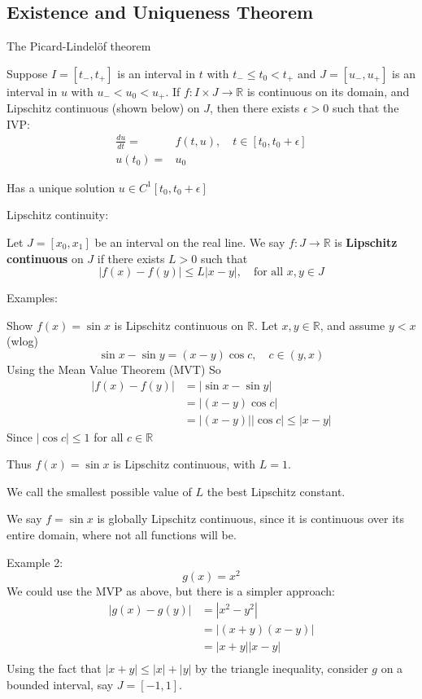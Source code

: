 \documentclass{X:/Documents/Coding/Latex/myassignment}
\begin{document}
\subsection{Existence and Uniqueness Theorem}
The Picard-Lindel\"of theorem 

Suppose $I = [t_-,t_+]$ is an interval in $t$ with $t_- \leq t_0 < t_+$ and $J=[u_-,u_+]$ is an interval in $u$ with $u_-<u_0<u_+$. If $f : I\times J \to \mathbb{R}$ is continuous on its domain, and Lipschitz continuous (shown below) on $J$, then there exists $\epsilon >0$ such that the IVP:
\begin{align*}
    \frac{du}{dt} =& f(t,u),\quad t\in [t_0,t_0+\epsilon]\\
    u(t_0) =& u_0
\end{align*}

Has a unique solution $u \in C^1 [t_0,t_0+\epsilon]$

Lipschitz continuity:

Let $J=[x_0,x_1]$ be an interval on the real line. We say $f: J\to \mathbb{R}$ is  \textbf{Lipschitz continuous} on $J$ if there exists $L>0$ such that
\[|f(x) - f(y)| \leq L|x-y|,\quad \text{for all } x,y\in J\]

Examples:

Show $f(x) = \sin x$ is Lipschitz continuous on $\mathbb{R}$. Let $x,y \in \mathbb{R}$, and assume $y < x$ (wlog)
\[\sin x - \sin y = (x - y)\cos c,\quad c \in (y,x)\]
Using the Mean Value Theorem (MVT)
So
\begin{align*}
    |f(x) - f(y)| &= |\sin x - \sin y|\\
    &=|(x - y)\cos c|\\
    &=|(x-y)||\cos c| \leq |x-y|
\end{align*}
Since $|\cos c| \leq 1 $ for all $c \in \mathbb{R}$

Thus $f(x) = \sin x$ is Lipschitz continuous, with $L=1$. 

We call the smallest possible value of $L$ the best Lipschitz constant.

We say $f=\sin x$ is globally Lipschitz continuous, since it is continuous over its entire domain, where not all functions will be.


Example 2:
\[g(x) = x^2\]
We could use the MVP as above, but there is a simpler approach:
\begin{align*}
    |g(x) - g(y)| &= |x^2 - y^2|\\
    &= |(x+y)(x-y)|\\
    &= |x+y||x-y|\\
\end{align*}
Using the fact that $|x+y| \leq |x|+|y|$ by the triangle inequality, consider $g$ on a bounded interval, say $J = [-1,1]$.
\end{document}
